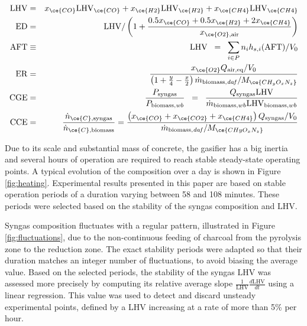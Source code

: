 \begin{eqnarray}
\label{eq:LHV} \mathrm{LHV} &=& x_{\ce{CO}}\mathrm{LHV}_{\ce{CO}} + x_{\ce{H2}}\mathrm{LHV}_{\ce{H2}} + x_{\ce{CH4}}\mathrm{LHV}_{\ce{CH4}}\\
\label{eq:ED} \mathrm{ED} &=& \left.\mathrm{LHV}\right/ \left(1 + \frac{0.5x_{\ce{CO}} + 0.5x_{\ce{H2}} + 2x_{\ce{CH4}}}{x_{\ce{O2},\text{air}}}\right)\\
\label{eq:AFT} \mathrm{AFT} & \equiv &\mathrm{LHV} \;\;= \;\; \sum_{i\in P} n_i h_{s,i}(\mathrm{AFT})/V_0\\
\label{eq:ER_XP} \mathrm{ER} &=& \frac{x_{\ce{O2}}Q_\text{air,eq}/V_0}{\left(1+\frac y4 - \frac x2\right)\dot m_{\text{biomass},\mathit{daf}}/M_{\ce{CH_yO_xN_z}}}\\
\label{eq:CGE_XP} \mathrm{CGE}&=&\frac{P_\text{syngas}}{P_\text{biomass,\textit{wb}}}\;\; = \;\;\frac{Q_\text{syngas}\mathrm{LHV}}{\dot m_{\text{biomass},wb}\mathrm{LHV}_{\text{biomass},wb}}\\
\label{eq:CCE} \mathrm{CCE} &=& \frac{\dot n_{\ce{C},\text{syngas}}}{\dot n_{\ce{C},\text{biomass}}} =  \frac{\left(x_{\ce{CO}}+x_{\ce{CO2}}+x_{\ce{CH4}}\right) Q_\text{syngas}/V_0}{\dot m_{\text{biomass},\mathit{daf}}/M_{\ce{CHyO_xN_z}}}
\end{eqnarray}

Due to its scale and substantial mass of concrete, the gasifier has a big inertia and several hours of operation are required to reach stable steady-state operating points. A typical evolution of the composition over a day is shown in Figure \ref{fig:heating}. Experimental results presented in this paper are based on stable operation periods of a duration varying between 58 and 108 minutes. These periods were selected based on the stability of the syngas composition and $\mathrm{LHV}$.

Syngas composition fluctuates with a regular pattern, illustrated in Figure \ref{fig:fluctuations}, due to the non-continuous feeding of charcoal from the pyrolysis zone to the reduction zone. The exact stability periods were adapted so that their duration matches an integer number of fluctuations, to avoid biasing the average value. Based on the selected periods, the stability of the syngas $\mathrm{LHV}$ was assessed more precisely by computing its relative average slope $\frac{1}{\mathrm{LHV}}\frac{d\mathrm{LHV}}{dt}$ using a linear regression. This value was used to detect and discard unsteady experimental points, defined by a $\mathrm{LHV}$ increasing at a rate of more than 5\% per hour.

